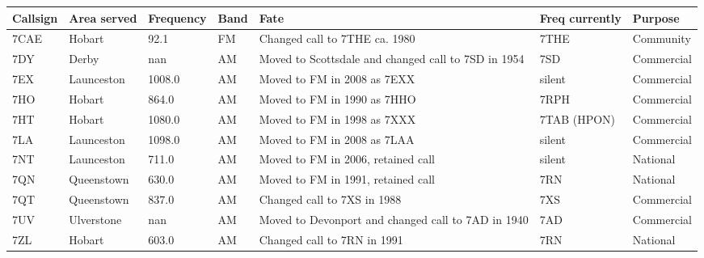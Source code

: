 \documentclass{article}
\begin{document}
\begin{tabular}{lllllll}
\toprule
Callsign & Area served & Frequency & Band & Fate & Freq currently & Purpose \\
\midrule
7CAE & Hobart & 92.1 & FM & Changed call to 7THE ca. 1980 & 7THE & Community \\
7DY & Derby & nan & AM & Moved to Scottsdale and changed call to 7SD in 1954 & 7SD & Commercial \\
7EX & Launceston & 1008.0 & AM & Moved to FM in 2008 as 7EXX & silent & Commercial \\
7HO & Hobart & 864.0 & AM & Moved to FM in 1990 as 7HHO & 7RPH & Commercial \\
7HT & Hobart & 1080.0 & AM & Moved to FM in 1998 as 7XXX & 7TAB (HPON) & Commercial \\
7LA & Launceston & 1098.0 & AM & Moved to FM in 2008 as 7LAA & silent & Commercial \\
7NT & Launceston & 711.0 & AM & Moved to FM in 2006, retained call & silent & National \\
7QN & Queenstown & 630.0 & AM & Moved to FM in 1991, retained call & 7RN & National \\
7QT & Queenstown & 837.0 & AM & Changed call to 7XS in 1988 & 7XS & Commercial \\
7UV & Ulverstone & nan & AM & Moved to Devonport and changed call to 7AD in 1940 & 7AD & Commercial \\
7ZL & Hobart & 603.0 & AM & Changed call to 7RN in 1991 & 7RN & National \\
\bottomrule
\end{tabular}
\end{document}
